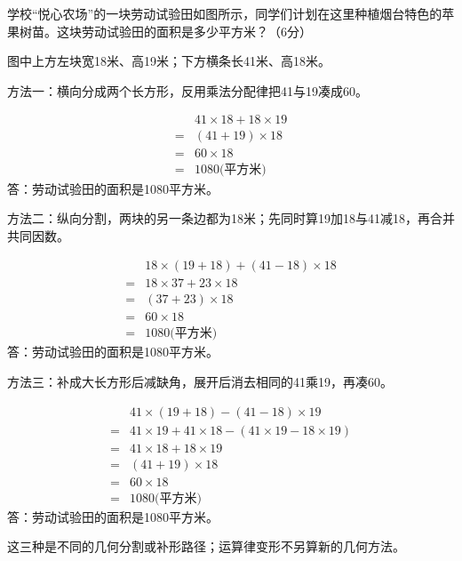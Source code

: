学校“悦心农场”的一块劳动试验田如图所示，同学们计划在这里种植烟台特色的苹果树苗。这块劳动试验田的面积是多少平方米？（6分）\par
{}
\begin{BookAnswer}
图中上方左块宽18米、高19米；下方横条长41米、高18米。\par 方法一：横向分成两个长方形，反用乘法分配律把41与19凑成60。\par \[\begin{aligned}&41\times18+18\times19\\={}&(41+19)\times18\\={}&60\times18\\={}&1080\text{(平方米)}\end{aligned}\]答：劳动试验田的面积是1080平方米。\par 方法二：纵向分割，两块的另一条边都为18米；先同时算19加18与41减18，再合并共同因数。\par \[\begin{aligned}&18\times(19+18)+(41-18)\times18\\={}&18\times37+23\times18\\={}&(37+23)\times18\\={}&60\times18\\={}&1080\text{(平方米)}\end{aligned}\]答：劳动试验田的面积是1080平方米。\par 方法三：补成大长方形后减缺角，展开后消去相同的41乘19，再凑60。\par \[\begin{aligned}&41\times(19+18)-(41-18)\times19\\={}&41\times19+41\times18-(41\times19-18\times19)\\={}&41\times18+18\times19\\={}&(41+19)\times18\\={}&60\times18\\={}&1080\text{(平方米)}\end{aligned}\]答：劳动试验田的面积是1080平方米。\par 这三种是不同的几何分割或补形路径；运算律变形不另算新的几何方法。
\end{BookAnswer}
